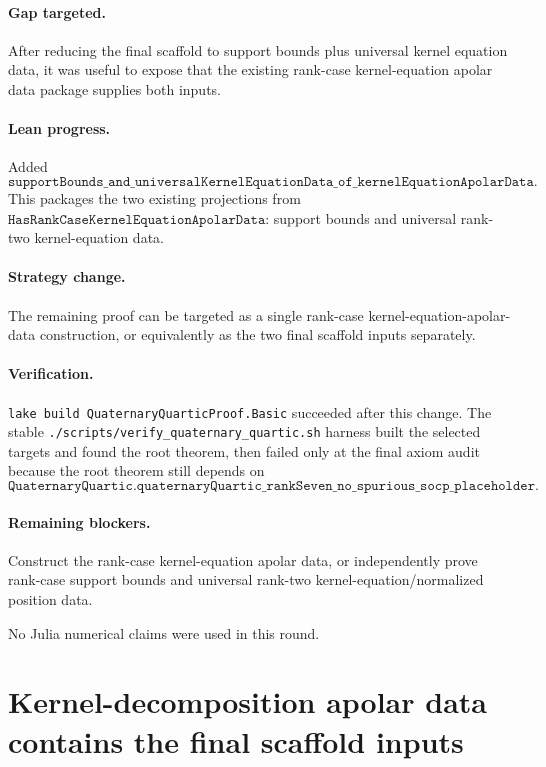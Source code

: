 \documentclass[11pt]{article}
\begin{document}
\paragraph{Gap targeted.}
After reducing the final scaffold to support bounds plus universal kernel
equation data, it was useful to expose that the existing rank-case
kernel-equation apolar data package supplies both inputs.

\paragraph{Lean progress.}
Added
\[
\texttt{supportBounds\_and\_universalKernelEquationData\_of\_kernelEquationApolarData}.
\]
This packages the two existing projections from
\(\texttt{HasRankCaseKernelEquationApolarData}\): support bounds and universal
rank-two kernel-equation data.

\paragraph{Strategy change.}
The remaining proof can be targeted as a single rank-case
kernel-equation-apolar-data construction, or equivalently as the two final
scaffold inputs separately.

\paragraph{Verification.}
\texttt{lake build QuaternaryQuarticProof.Basic} succeeded after this change.
The stable \texttt{./scripts/verify\_quaternary\_quartic.sh} harness built the
selected targets and found the root theorem, then failed only at the final axiom
audit because the root theorem still depends on
\[
\texttt{QuaternaryQuartic.quaternaryQuartic\_rankSeven\_no\_spurious\_socp\_placeholder}.
\]

\paragraph{Remaining blockers.}
Construct the rank-case kernel-equation apolar data, or independently prove
rank-case support bounds and universal rank-two kernel-equation/normalized
position data.

No Julia numerical claims were used in this round.

\section*{Kernel-decomposition apolar data contains the final scaffold inputs}
\end{document}
